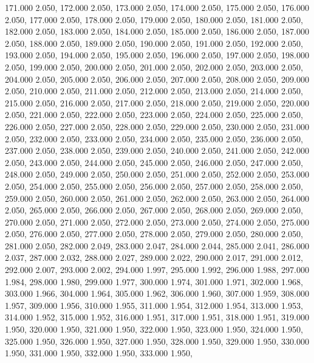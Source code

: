 171.000 2.050, 
172.000 2.050, 
173.000 2.050, 
174.000 2.050, 
175.000 2.050, 
176.000 2.050, 
177.000 2.050, 
178.000 2.050, 
179.000 2.050, 
180.000 2.050, 
181.000 2.050, 
182.000 2.050, 
183.000 2.050, 
184.000 2.050, 
185.000 2.050, 
186.000 2.050, 
187.000 2.050, 
188.000 2.050, 
189.000 2.050, 
190.000 2.050, 
191.000 2.050, 
192.000 2.050, 
193.000 2.050, 
194.000 2.050, 
195.000 2.050, 
196.000 2.050, 
197.000 2.050, 
198.000 2.050, 
199.000 2.050, 
200.000 2.050, 
201.000 2.050, 
202.000 2.050, 
203.000 2.050, 
204.000 2.050, 
205.000 2.050, 
206.000 2.050, 
207.000 2.050, 
208.000 2.050, 
209.000 2.050, 
210.000 2.050, 
211.000 2.050, 
212.000 2.050, 
213.000 2.050, 
214.000 2.050, 
215.000 2.050, 
216.000 2.050, 
217.000 2.050, 
218.000 2.050, 
219.000 2.050, 
220.000 2.050, 
221.000 2.050, 
222.000 2.050, 
223.000 2.050, 
224.000 2.050, 
225.000 2.050, 
226.000 2.050, 
227.000 2.050, 
228.000 2.050, 
229.000 2.050, 
230.000 2.050, 
231.000 2.050, 
232.000 2.050, 
233.000 2.050, 
234.000 2.050, 
235.000 2.050, 
236.000 2.050, 
237.000 2.050, 
238.000 2.050, 
239.000 2.050, 
240.000 2.050, 
241.000 2.050, 
242.000 2.050, 
243.000 2.050, 
244.000 2.050, 
245.000 2.050, 
246.000 2.050, 
247.000 2.050, 
248.000 2.050, 
249.000 2.050, 
250.000 2.050, 
251.000 2.050, 
252.000 2.050, 
253.000 2.050, 
254.000 2.050, 
255.000 2.050, 
256.000 2.050, 
257.000 2.050, 
258.000 2.050, 
259.000 2.050, 
260.000 2.050, 
261.000 2.050, 
262.000 2.050, 
263.000 2.050, 
264.000 2.050, 
265.000 2.050, 
266.000 2.050, 
267.000 2.050, 
268.000 2.050, 
269.000 2.050, 
270.000 2.050, 
271.000 2.050, 
272.000 2.050, 
273.000 2.050, 
274.000 2.050, 
275.000 2.050, 
276.000 2.050, 
277.000 2.050, 
278.000 2.050, 
279.000 2.050, 
280.000 2.050, 
281.000 2.050, 
282.000 2.049, 
283.000 2.047, 
284.000 2.044, 
285.000 2.041, 
286.000 2.037, 
287.000 2.032, 
288.000 2.027, 
289.000 2.022, 
290.000 2.017, 
291.000 2.012, 
292.000 2.007, 
293.000 2.002, 
294.000 1.997, 
295.000 1.992, 
296.000 1.988, 
297.000 1.984, 
298.000 1.980, 
299.000 1.977, 
300.000 1.974, 
301.000 1.971, 
302.000 1.968, 
303.000 1.966, 
304.000 1.964, 
305.000 1.962, 
306.000 1.960, 
307.000 1.959, 
308.000 1.957, 
309.000 1.956, 
310.000 1.955, 
311.000 1.954, 
312.000 1.954, 
313.000 1.953, 
314.000 1.952, 
315.000 1.952, 
316.000 1.951, 
317.000 1.951, 
318.000 1.951, 
319.000 1.950, 
320.000 1.950, 
321.000 1.950, 
322.000 1.950, 
323.000 1.950, 
324.000 1.950, 
325.000 1.950, 
326.000 1.950, 
327.000 1.950, 
328.000 1.950, 
329.000 1.950, 
330.000 1.950, 
331.000 1.950, 
332.000 1.950, 
333.000 1.950, 
